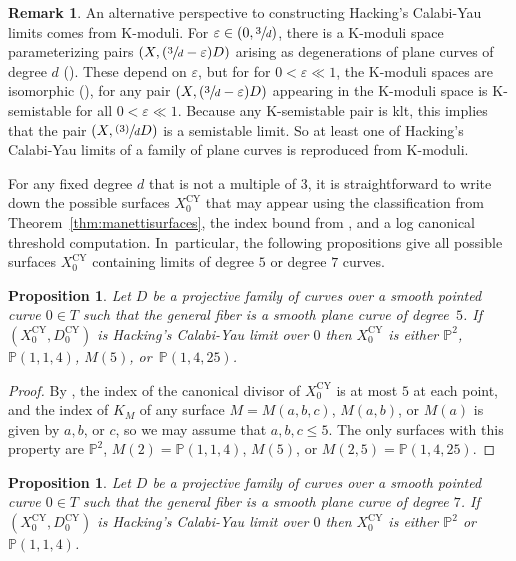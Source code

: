 \documentclass[JEP,XML,SOM,Unicode,NoFloatCountersInSection,published]{cedram}
\newcommand{\psfrac}[2]{\sfrac{(#1)}{#2}}
\let\epsilon\varepsilon
\theoremstyle{plain}
\newtheorem{proposition}[theorem]{Proposition}
\theoremstyle{definition}
\newtheorem{remark}[theorem]{Remark}
\newcommand\PP{{\mathbb{P}}}
\newcommand\Dcyo{{D^{\mathrm{CY}}_0}}
\newcommand\Xcyo{{X^{\mathrm{CY}}_0}}
\begin{document}
\begin{remark}
An alternative perspective to constructing Hacking's Calabi-Yau limits comes from K-moduli. For $\epsilon \in (0, \sfrac{3}{d})$, there is a K-moduli space parameterizing pairs $(X, (\sfrac{3}{d}-\epsilon)D)$ arising as degenerations of plane curves of degree $d$ (\cf \cite{ADL19}). These depend on $\epsilon$, but for for $0< \epsilon \ll 1$, the K-moduli spaces are isomorphic (\cite[Th.\,1.2]{ADL19}), \ie for any pair $(X, (\sfrac{3}{d} - \epsilon)D)$ appearing in the K-moduli space is K\nobreakdash-semistable for all $0< \epsilon \ll 1$. Because any K-semistable pair is klt, this implies that the pair $(X, \psfrac{3}{d}D)$ is a semistable limit. So at least one of Hacking's Calabi-Yau limits of a family of plane curves is reproduced from K-moduli.
\end{remark}

For any fixed degree $d$ that is not a multiple of $3$, it is straightforward to write down the possible surfaces $\Xcyo$ that may appear using the classification from Theorem~\ref{thm:manettisurfaces}, the index bound from \cite[Th.\,4.5]{Hacking}, and a log canonical threshold computation. In~particular, the following propositions give all possible surfaces $\Xcyo$ containing limits of degree $5$ or degree $7$ curves.

\begin{proposition}\label{degree5surfaces}
Let $D$ be a projective family of curves over a smooth pointed curve $0 \in T$ such that the general fiber is a smooth plane curve of degree~$5$. If~$(\Xcyo,\Dcyo)$ is Hacking's Calabi-Yau limit over $0$ then $\Xcyo$ is either $\PP^2$, $\PP(1,1,4)$, $M(5)$, or~$\PP(1,4,25)$.
\end{proposition}

\begin{proof}
By \cite[Th.\,4.5]{Hacking}, the index of the canonical divisor of $\Xcyo$ is at most $5$ at each point, and the index of $K_M$ of any surface $M = M(a,b,c)$, $M(a,b)$, or $M(a)$ is given by $a,b$, or $c$, so we may assume that $a,b,c \le 5$. The only surfaces with this property are $\PP^2$, $M(2) = \PP(1,1,4)$, $M(5)$, or $M(2,5) = \PP(1,4,25)$.
\end{proof}

\begin{proposition}\label{degree7noindex5surface}
Let $D$ be a projective family of curves over a smooth pointed curve $0 \in T$ such that the general fiber is a smooth plane curve of degree $7$. If $(\Xcyo,\Dcyo)$ is Hacking's Calabi-Yau limit over $0$ then $\Xcyo$ is either $\PP^2$ or $\PP(1,1,4)$.
\end{proposition}
\end{document}
